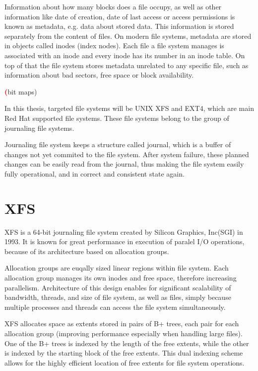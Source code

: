 \documentclass[
  color, %
  table, %
  lof,   %
  lot,   %
]{fithesis3}
\newcommand{\todo}[1]{\textcolor{red}{\textbf{#1}}}
\begin{document}
Information about how many blocks does a file occupy, as well as other information like date of creation, date of last access or access permissions is known as metadata, e.g. data about stored data. This information is stored separately from the content of files. On modern file systems, metadata are stored in objects called inodes (index nodes). Each file a file system manages is associated with an inode and every inode has its number in an inode table. On top of that the file system stores metadata unrelated to any specific file, such as information about bad sectors, free space or block availability.


\todo(bit maps)

In this thesis, targeted file systems will be UNIX XFS and EXT4, which are main Red Hat supported file systems. These file systems belong to the group of journaling file systems.

Journaling file system keeps a structure called journal, which is a buffer of changes not yet commited to the file system. After system failure, these planned changes can be easily read from the journal, thus making the file system easily fully operational, and in correct and consistent state again.

\section{XFS}
XFS is a 64-bit journaling file system created by Silicon Graphics, Inc(SGI) in 1993. It is known for great performance in execution of paralel I/O operations, because of its architecture based on allocation groups.

Allocation groups are euqally sized linear regions within file system. Each allocation group manages its own inodes and free space, therefore increasing parallelism.
Architecture of this design enables for significant scalability of bandwidth, threads, and size of file system, as well as files, simply because multiple processes and threads can access the file system simultaneously.

XFS allocates space as extents stored in pairs of B+ trees, each pair for each allocation group (improving performance especially when handling large files). One of the B+ trees is indexed by the length of the free extents, while the other is indexed by the starting block of the free extents. This dual indexing scheme allows for the highly efficient location of free extents for file system operations.
\end{document}
